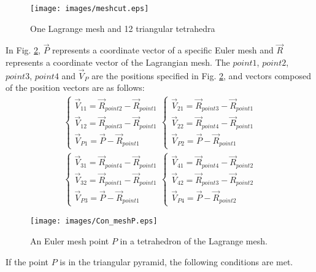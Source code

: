 \begin{enumerate}
\begin{figure}[H]
	\centering
	\texttt{[image: images/meshcut.eps]}
	\caption{One Lagrange mesh and 12 triangular tetrahedra}\label{meshcut}
\end{figure}

In Fig. \ref{meshsearch}, $\vec P$ represents a coordinate vector of a specific Euler mesh and $\vec R$ represents a coordinate vector of the Lagrangian mesh. The $point1$, $point2$, $point3$, $point4$ and $\vec V_P$ are the positions specified in Fig. \ref{meshsearch}, and vectors composed of the position vectors are as follows: 
\begin{eqnarray*}
	\begin{cases}
		{\vec V}_{11}={\vec R}_{point2}-{\vec R}_{point1}\\
		{\vec V}_{12}={\vec R}_{point3}-{\vec R}_{point1}\\
		{\vec V}_{P1}={\vec P}-{\vec R}_{point1}
	\end{cases}
	\begin{cases}
		{\vec V}_{21}={\vec R}_{point3}-{\vec R}_{point1}\\
		{\vec V}_{22}={\vec R}_{point4}-{\vec R}_{point1}\\
		{\vec V}_{P2}={\vec P}-{\vec R}_{point1}
	\end{cases}\\
	\begin{cases}
		{\vec V}_{31}={\vec R}_{point4}-{\vec R}_{point1}\\
		{\vec V}_{32}={\vec R}_{point1}-{\vec R}_{point1}\\
		{\vec V}_{P3}={\vec P}-{\vec R}_{point1}
	\end{cases}
\begin{cases}
		{\vec V}_{41}={\vec R}_{point4}-{\vec R}_{point2}\\
		{\vec V}_{42}={\vec R}_{point3}-{\vec R}_{point2}\\
		{\vec V}_{P4}={\vec P}-{\vec R}_{point2}
	\end{cases}
\end{eqnarray*}

\begin{figure}[H]
	\centering
	\texttt{[image: images/Con\_meshP.eps]}
	\caption{An Euler mesh point $P$ in a tetrahedron of the Lagrange mesh. }\label{meshsearch}
\end{figure}

If the point $P$ is in the triangular pyramid, the following conditions are met. 


\end{enumerate}
